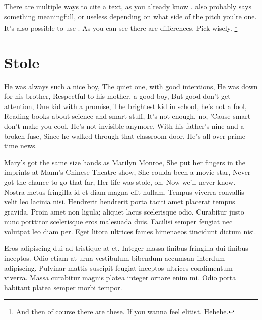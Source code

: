 There are multiple ways to cite a text, as you already know \citep{colu92}. \citet{gree00} also probably says something meaningfull, or useless depending on what side of the pitch you're one. It's also possible to use \cite{jame76}. As you can see there are differences. Pick wisely. \footnote{And then of course there are these. If you wanna feel elitist. Hehehe.}

\section{Stole}
He was always such a nice boy, The quiet one, with good intentions, He was down for his brother, Respectful to his mother, a good boy, But good don't get attention, One kid with a promise, The brightest kid in school, he's not a fool, Reading books about science and smart stuff, It's not enough, no, 'Cause smart don't make you cool, He's not invisible anymore, With his father's nine and a broken fuse, Since he walked through that classroom door, He's all over prime time news.

Mary's got the same size hands as Marilyn Monroe, She put her fingers in the imprints at Mann's Chinese Theatre show, She coulda been a movie star, Never got the chance to go that far, Her life was stole, oh, Now we'll never know.
Nostra metus fringilla id et diam magna elit nullam. Tempus viverra convallis velit leo lacinia nisi. Hendrerit hendrerit porta taciti amet placerat tempus gravida. Proin amet non ligula; aliquet lacus scelerisque odio. Curabitur justo nunc porttitor scelerisque eros malesuada duis. Facilisi semper feugiat nec volutpat leo diam per. Eget litora ultrices fames himenaeos tincidunt dictum nisi.

Eros adipiscing dui ad tristique at et. Integer massa finibus fringilla dui finibus inceptos. Odio etiam at urna vestibulum bibendum accumsan interdum adipiscing. Pulvinar mattis suscipit feugiat inceptos ultrices condimentum viverra. Massa curabitur magnis platea integer ornare enim mi. Odio porta habitant platea semper morbi tempor.

